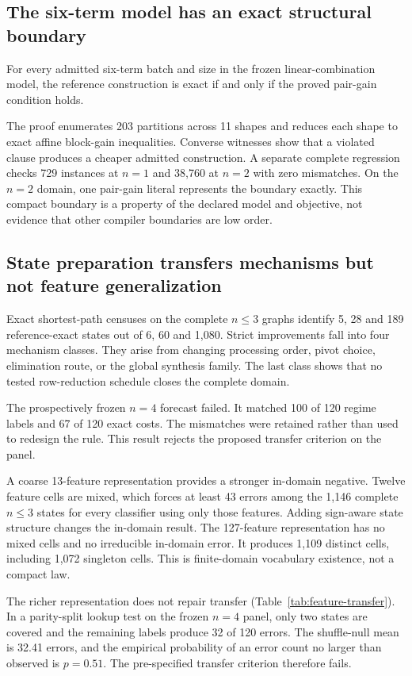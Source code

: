 \subsection{The six-term model has an exact structural boundary}

\begin{theorem}
For every admitted six-term batch and size in the frozen linear-combination model, the reference construction is exact if and only if the proved pair-gain condition holds.
\end{theorem}

The proof enumerates 203 partitions across 11 shapes and reduces each shape to exact affine block-gain inequalities.  Converse witnesses show that a violated clause produces a cheaper admitted construction.  A separate complete regression checks 729 instances at $n=1$ and 38,760 at $n=2$ with zero mismatches.  On the $n=2$ domain, one pair-gain literal represents the boundary exactly.  This compact boundary is a property of the declared model and objective, not evidence that other compiler boundaries are low order.

\subsection{State preparation transfers mechanisms but not feature generalization}

Exact shortest-path censuses on the complete $n\leq3$ graphs identify 5, 28 and 189 reference-exact states out of 6, 60 and 1,080.  Strict improvements fall into four mechanism classes.  They arise from changing processing order, pivot choice, elimination route, or the global synthesis family.  The last class shows that no tested row-reduction schedule closes the complete domain.

The prospectively frozen $n=4$ forecast failed.  It matched 100 of 120 regime labels and 67 of 120 exact costs.  The mismatches were retained rather than used to redesign the rule.  This result rejects the proposed transfer criterion on the panel.

A coarse 13-feature representation provides a stronger in-domain negative.  Twelve feature cells are mixed, which forces at least 43 errors among the 1,146 complete $n\leq3$ states for every classifier using only those features.  Adding sign-aware state structure changes the in-domain result.  The 127-feature representation has no mixed cells and no irreducible in-domain error.  It produces 1,109 distinct cells, including 1,072 singleton cells.  This is finite-domain vocabulary existence, not a compact law.

The richer representation does not repair transfer (Table~\ref{tab:feature-transfer}).  In a parity-split lookup test on the frozen $n=4$ panel, only two states are covered and the remaining labels produce 32 of 120 errors.  The shuffle-null mean is 32.41 errors, and the empirical probability of an error count no larger than observed is $p=0.51$.  The pre-specified transfer criterion therefore fails.
